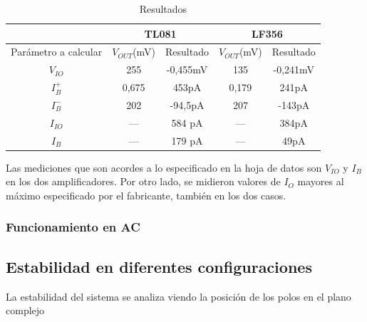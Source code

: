 \documentclass[../../main.tex]{subfiles}
\begin{document}
\begin{table}[htbp]
\centering
\begin{tabular}{ccccc}
                       & \multicolumn{2}{c}{TL081} & \multicolumn{2}{c}{LF356} \\
\hline
Par\'ametro a calcular & $V_{OUT}$(mV)& Resultado  & $V_{OUT}$(mV)& Resultado  \\
\hline
$V_{IO}$               & 255          & -0,455mV   & 135          & -0,241mV   \\
$I_B^+$                & 0,675        & 453pA      & 0,179        & 241pA      \\
$I_B^-$                & 202          & -94,5pA    & 207          & -143pA     \\
$I_{IO}$			   &     ---      & 584 pA	   &	  ---     & 384pA      \\
$I_B$				   &     ---      & 179 pA     &      ---     & 49pA
\end{tabular}%

\caption{Resultados}
\label{tab:ej_3_resultados}
\end{table}

Las mediciones que son acordes a lo especificado en la hoja de datos son $V_{IO}$  y $I_B$ en los dos amplificadores. Por otro lado, se midieron valores de $I_O$ mayores al m\'aximo especificado por el fabricante, tambi\'en en los dos casos.



\subsubsection{Funcionamiento en AC}























\subsection{Estabilidad en diferentes configuraciones}




La estabilidad del sistema se analiza viendo la posici\'on de los polos en el plano complejo
\end{document}
